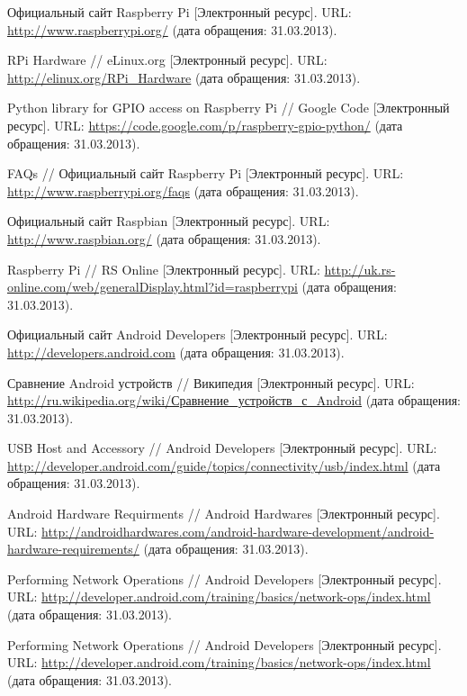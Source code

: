 \begin{thebibliography}{99}
Официальный сайт Raspberry Pi [Электронный ресурс].
URL: \url{http://www.raspberrypi.org/} (дата обращения: 31.03.2013).

RPi Hardware // eLinux.org [Электронный ресурс]. 
URL: \url{http://elinux.org/RPi_Hardware} (дата обращения: 31.03.2013).

Python library for GPIO access on Raspberry Pi // Google Code [Электронный ресурс].
URL: \url{https://code.google.com/p/raspberry-gpio-python/} (дата обращения: 31.03.2013).

FAQs // Официальный сайт Raspberry Pi [Электронный ресурс].
URL: \url{http://www.raspberrypi.org/faqs} (дата обращения: 31.03.2013).

Официальный сайт Raspbian [Электронный ресурс].
URL: \url{http://www.raspbian.org/} (дата обращения: 31.03.2013).

Raspberry Pi // RS Online [Электронный ресурс].
URL: \url{http://uk.rs-online.com/web/generalDisplay.html?id=raspberrypi} (дата обращения: 31.03.2013).


Официальный сайт Android Developers [Электронный ресурс].
URL: \url{http://developers.android.com} (дата обращения: 31.03.2013).

Сравнение Android устройств // Википедия [Электронный ресурс].
URL: \url{http://ru.wikipedia.org/wiki/Сравнение_устройств_с_Android} (дата обращения: 31.03.2013).

USB Host and Accessory // Android Developers [Электронный ресурс].
URL: \url{http://developer.android.com/guide/topics/connectivity/usb/index.html} (дата обращения: 31.03.2013).

Android Hardware Requirments // Android Hardwares [Электронный ресурс].
URL: \url{http://androidhardwares.com/android-hardware-development/android-hardware-requirements/} (дата обращения: 31.03.2013).

Performing Network Operations // Android Developers [Электронный ресурс].
URL: \url{http://developer.android.com/training/basics/network-ops/index.html} (дата обращения: 31.03.2013).

Performing Network Operations // Android Developers [Электронный ресурс].
URL: \url{http://developer.android.com/training/basics/network-ops/index.html} (дата обращения: 31.03.2013).


\end{thebibliography}
